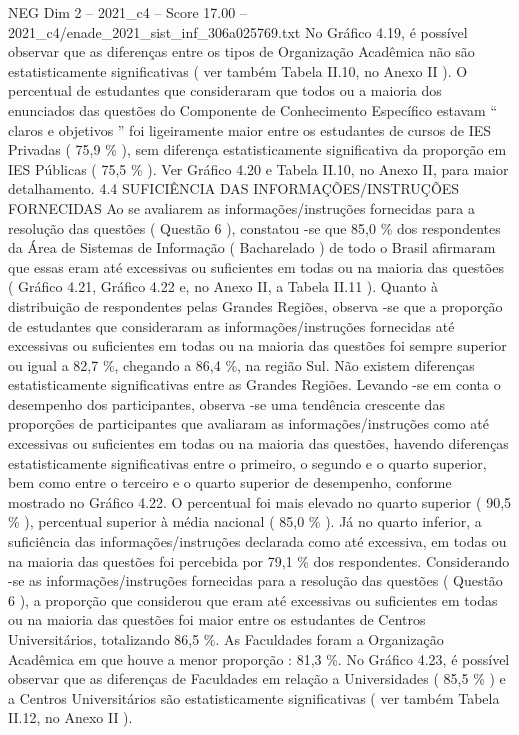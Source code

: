 \begin{textsample}{NEG Dim 2 – 2021\_c4 – Score 17.00 – 2021\_c4/enade\_2021\_sist\_inf\_306a025769.txt}
No Gráfico 4.19, é possível observar que as diferenças entre os tipos de Organização Acadêmica não são estatisticamente significativas ( ver também Tabela II.10, no Anexo II ).
O percentual de estudantes que consideraram que todos ou a maioria dos enunciados das questões do Componente de Conhecimento Específico estavam “ claros e objetivos ” foi ligeiramente maior entre os estudantes de cursos de IES Privadas ( 75,9 \% ), sem diferença estatisticamente significativa da proporção em IES Públicas ( 75,5 \% ).
Ver Gráfico 4.20 e Tabela II.10, no Anexo II, para maior detalhamento. 4.4 SUFICIÊNCIA DAS INFORMAÇÕES/INSTRUÇÕES FORNECIDAS Ao se avaliarem as informações/instruções fornecidas para a resolução das questões ( Questão 6 ), constatou -se que 85,0 \% dos respondentes da Área de Sistemas de Informação ( Bacharelado ) de todo o Brasil afirmaram que essas eram até excessivas ou suficientes em todas ou na maioria das questões ( Gráfico 4.21, Gráfico 4.22 e, no Anexo II, a Tabela II.11 ).
Quanto à distribuição de respondentes pelas Grandes Regiões, observa -se que a proporção de estudantes que consideraram as informações/instruções fornecidas até excessivas ou suficientes em todas ou na maioria das questões foi sempre superior ou igual a 82,7 \%, chegando a 86,4 \%, na região Sul.
Não existem diferenças estatisticamente significativas entre as Grandes Regiões.
Levando -se em conta o desempenho dos participantes, observa -se uma tendência crescente das proporções de participantes que avaliaram as informações/instruções como até excessivas ou suficientes em todas ou na maioria das questões, havendo diferenças estatisticamente significativas entre o primeiro, o segundo e o quarto superior, bem como entre o terceiro e o quarto superior de desempenho, conforme mostrado no Gráfico 4.22.
O percentual foi mais elevado no quarto superior ( 90,5 \% ), percentual superior à média nacional ( 85,0 \% ).
Já no quarto inferior, a suficiência das informações/instruções declarada como até excessiva, em todas ou na maioria das questões foi percebida por 79,1 \% dos respondentes.
Considerando -se as informações/instruções fornecidas para a resolução das questões ( Questão 6 ), a proporção que considerou que eram até excessivas ou suficientes em todas ou na maioria das questões foi maior entre os estudantes de Centros Universitários, totalizando 86,5 \%.
As Faculdades foram a Organização Acadêmica em que houve a menor proporção : 81,3 \%.
No Gráfico 4.23, é possível observar que as diferenças de Faculdades em relação a Universidades ( 85,5 \% ) e a Centros Universitários são estatisticamente significativas ( ver também Tabela II.12, no Anexo II ).

\end{textsample}
